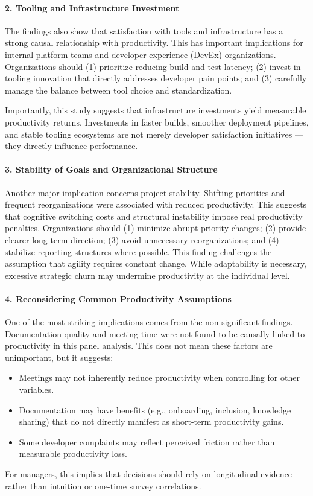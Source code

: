 \paragraph{2. Tooling and Infrastructure Investment}
The findings also show that satisfaction with tools and infrastructure has a strong causal relationship with productivity. This has important implications for internal platform teams and developer experience (DevEx) organizations.
Organizations should (1) prioritize reducing build and test latency; (2) invest in tooling innovation that directly addresses developer pain points; and (3) carefully manage the balance between tool choice and standardization.

Importantly, this study suggests that infrastructure investments yield measurable productivity returns. Investments in faster builds, smoother deployment pipelines, and stable tooling ecosystems are not merely developer satisfaction initiatives — they directly influence performance.

\paragraph{3. Stability of Goals and Organizational Structure}
Another major implication concerns project stability. Shifting priorities and frequent reorganizations were associated with reduced productivity. This suggests that cognitive switching costs and structural instability impose real productivity penalties. Organizations should (1) minimize abrupt priority changes; (2) provide clearer long-term direction; (3) avoid unnecessary reorganizations; and (4) stabilize reporting structures where possible. This finding challenges the assumption that agility requires constant change. While adaptability is necessary, excessive strategic churn may undermine productivity at the individual level.

\paragraph{4. Reconsidering Common Productivity Assumptions}
One of the most striking implications comes from the non-significant findings. Documentation quality and meeting time were not found to be causally linked to productivity in this panel analysis. This does not mean these factors are unimportant, but it suggests:
\begin{itemize}
    \item Meetings may not inherently reduce productivity when controlling for other variables.
    \item Documentation may have benefits (e.g., onboarding, inclusion, knowledge sharing) that do not directly manifest as short-term productivity gains.
    \item Some developer complaints may reflect perceived friction rather than measurable productivity loss.
\end{itemize}
For managers, this implies that decisions should rely on longitudinal evidence rather than intuition or one-time survey correlations.